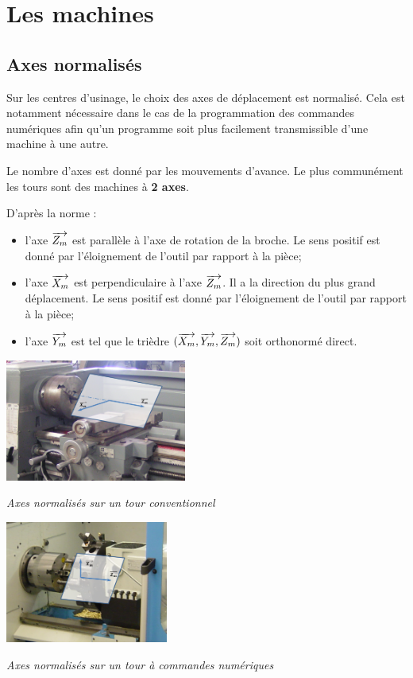 \documentclass[11pt,oneside]{article}
\begin{document}
\section{Les machines}
\subsection{Axes normalisés}
Sur les centres d'usinage, le choix des axes de déplacement est normalisé. Cela est notamment nécessaire dans le cas de la programmation des commandes numériques afin qu'un programme soit plus facilement transmissible d'une machine à une autre. 

Le nombre d'axes est donné par les mouvements d'avance. Le plus communément les tours sont des machines à \textbf{2 axes}.

D'après la norme :
\begin{itemize}
\item l'axe $\overrightarrow{Z_m}$ est parallèle à l'axe de rotation de la broche. Le sens positif est donné par l'éloignement de l'outil par rapport à la pièce;
\item l'axe $\overrightarrow{X_m}$ est perpendiculaire à l'axe $\overrightarrow{Z_m}$. Il a la direction du plus grand déplacement. Le sens positif est donné par l'éloignement de l'outil par rapport à la pièce;
\item l'axe $\overrightarrow{Y_m}$ est tel que le trièdre $(\overrightarrow{X_m},\overrightarrow{Y_m},\overrightarrow{Z_m})$ soit orthonormé direct. 
\end{itemize}

\begin{minipage}[c]{.45\linewidth}
\begin{center}
\includegraphics[height=4cm]{png/axes_normalises}

\textit{Axes normalisés sur un tour conventionnel}
\end{center}
\end{minipage}\hfill
\begin{minipage}[c]{.45\linewidth}
\begin{center}
\includegraphics[height=4cm]{png/axes_normalises_2}

\textit{Axes normalisés sur un tour à commandes numériques}
\end{center}
\end{minipage}
\end{document}
